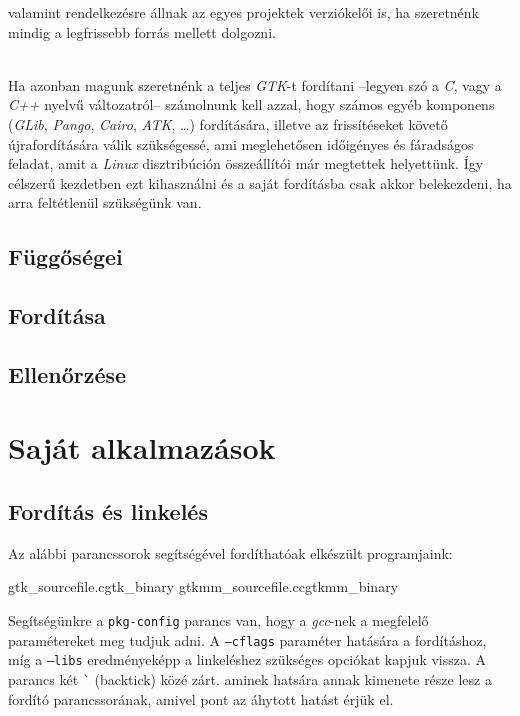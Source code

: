 valamint rendelkezésre állnak az egyes projektek verziókelői is, ha szeretnénk mindig a legfrissebb forrás mellett dolgozni.

\\

Ha azonban magunk szeretnénk a teljes \textit{GTK}-t fordítani --legyen szó a \textit{C}, vagy a \textit{C++} nyelvű változatról-- számolnunk kell azzal, hogy számos egyéb komponens (\textit{GLib}, \textit{Pango}, \textit{Cairo}, \textit{ATK}, \dots) fordítására, illetve az frissítéseket követő újrafordítására válik szükségessé, ami meglehetősen időigényes és fáradságos feladat, amit a \textit{Linux} disztribúción összeállítói már megtettek helyettünk. Így célszerű kezdetben ezt kihasználni és a saját fordításba csak akkor belekezdeni, ha arra feltétlenül szükségünk van.

\subsection{Függőségei}

\subsection{Fordítása}

\subsection{Ellenőrzése}

\section{Saját alkalmazások}

\subsection{Fordítás és linkelés}
\label{sec:compilingandlinking}

Az alábbi parancssorok segítségével fordíthatóak elkészült programjaink:

\lstcompiles
{gtk\_sourcefile.c}{gtk\_binary}
{gtkmm\_sourcefile.cc}{gtkmm\_binary}

Segítségünkre a \texttt{pkg-config} parancs van, hogy a \textit{gcc}-nek a megfelelő paramétereket meg tudjuk adni. A \texttt{--cflags} paraméter hatására a fordításhoz, míg a \texttt{--libs} eredményeképp a linkeléshez szükséges opciókat kapjuk vissza. A parancs két \texttt{\`} (backtick) közé zárt. aminek hatsára annak kimenete része lesz a fordító parancssorának, amivel pont az áhytott hatást érjük el.

